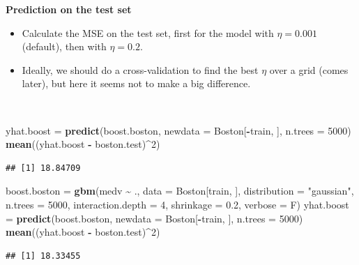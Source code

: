 \documentclass[
  10pt,
  ignorenonframetext,
]{beamer}
\newenvironment{Shaded}{\begin{snugshade}}{\end{snugshade}}
\newcommand{\AttributeTok}[1]{\textcolor[rgb]{0.13,0.29,0.53}{#1}}
\newcommand{\DecValTok}[1]{\textcolor[rgb]{0.00,0.00,0.81}{#1}}
\newcommand{\FloatTok}[1]{\textcolor[rgb]{0.00,0.00,0.81}{#1}}
\newcommand{\FunctionTok}[1]{\textcolor[rgb]{0.13,0.29,0.53}{\textbf{#1}}}
\newcommand{\NormalTok}[1]{#1}
\newcommand{\OtherTok}[1]{\textcolor[rgb]{0.56,0.35,0.01}{#1}}
\newcommand{\SpecialCharTok}[1]{\textcolor[rgb]{0.81,0.36,0.00}{\textbf{#1}}}
\newcommand{\StringTok}[1]{\textcolor[rgb]{0.31,0.60,0.02}{#1}}
\begin{document}
\begin{frame}[fragile]
\textbf{Prediction on the test set}

\begin{itemize}
\item
  Calculate the MSE on the test set, first for the model with
  \(\eta=0.001\) (default), then with \(\eta=0.2\).
\item
  Ideally, we should do a cross-validation to find the best \(\eta\)
  over a grid (comes later), but here it seems not to make a big
  difference.
\end{itemize}

\(~\)

\scriptsize

\begin{Shaded}
\begin{Highlighting}[]
\NormalTok{yhat.boost }\OtherTok{=} \FunctionTok{predict}\NormalTok{(boost.boston, }\AttributeTok{newdata =}\NormalTok{ Boston[}\SpecialCharTok{{-}}\NormalTok{train, ], }\AttributeTok{n.trees =} \DecValTok{5000}\NormalTok{)}
\FunctionTok{mean}\NormalTok{((yhat.boost }\SpecialCharTok{{-}}\NormalTok{ boston.test)}\SpecialCharTok{\^{}}\DecValTok{2}\NormalTok{)}
\end{Highlighting}
\end{Shaded}

\begin{verbatim}
## [1] 18.84709
\end{verbatim}

\vspace{2mm}

\begin{Shaded}
\begin{Highlighting}[]
\NormalTok{boost.boston }\OtherTok{=} \FunctionTok{gbm}\NormalTok{(medv }\SpecialCharTok{\textasciitilde{}}\NormalTok{ ., }\AttributeTok{data =}\NormalTok{ Boston[train, ], }\AttributeTok{distribution =} \StringTok{"gaussian"}\NormalTok{,}
    \AttributeTok{n.trees =} \DecValTok{5000}\NormalTok{, }\AttributeTok{interaction.depth =} \DecValTok{4}\NormalTok{, }\AttributeTok{shrinkage =} \FloatTok{0.2}\NormalTok{, }\AttributeTok{verbose =}\NormalTok{ F)}
\NormalTok{yhat.boost }\OtherTok{=} \FunctionTok{predict}\NormalTok{(boost.boston, }\AttributeTok{newdata =}\NormalTok{ Boston[}\SpecialCharTok{{-}}\NormalTok{train, ], }\AttributeTok{n.trees =} \DecValTok{5000}\NormalTok{)}
\FunctionTok{mean}\NormalTok{((yhat.boost }\SpecialCharTok{{-}}\NormalTok{ boston.test)}\SpecialCharTok{\^{}}\DecValTok{2}\NormalTok{)}
\end{Highlighting}
\end{Shaded}

\begin{verbatim}
## [1] 18.33455
\end{verbatim}
\end{frame}
\end{document}

